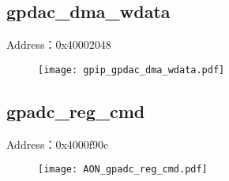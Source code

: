 \subsection{gpdac\_dma\_wdata}
\label{gpip-gpdac-dma-wdata}
Address：0x40002048
 \begin{figure}[H]
\texttt{[image: gpip\_gpdac\_dma\_wdata.pdf]}
\end{figure}

\subsection{gpadc\_reg\_cmd}
\label{AON-gpadc-reg-cmd}
Address：0x4000f90c
\begin{figure}[H]
	\texttt{[image: AON\_gpadc\_reg\_cmd.pdf]}
\end{figure}

